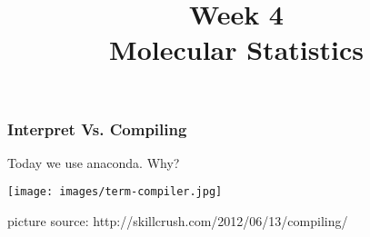 

\usepackage{soul}

\title[]{Week 4\\Molecular Statistics}








{
\usebackgroundtemplate{}
\begin{frame}[plain]
    \titlepage
    \addtocounter{framenumber}{-1}
\end{frame}
}

%
%
%
%
%
%
%
%
%

\begin{frame}[fragile]

    \frametitle{Interpret Vs. Compiling}

    \centering

    Today we use anaconda. Why?

    \texttt{[image: images/term-compiler.jpg]}

%
%
%

    {
        \scriptsize
        picture source: http://skillcrush.com/2012/06/13/compiling/
    }

\end{frame}


